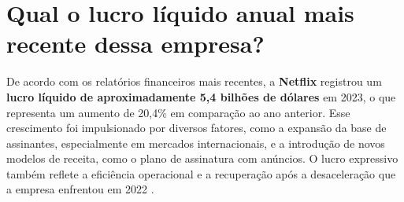 \section{Qual o lucro líquido anual mais recente dessa empresa?}

De acordo com os relatórios financeiros mais recentes, a \textbf{Netflix} registrou um \textbf{lucro líquido de aproximadamente 5,4 bilhões de dólares} em 2023, o que representa um aumento de 20,4\% em comparação ao ano anterior. Esse crescimento foi impulsionado por diversos fatores, como a expansão da base de assinantes, especialmente em mercados internacionais, e a introdução de novos modelos de receita, como o plano de assinatura com anúncios. O lucro expressivo também reflete a eficiência operacional e a recuperação após a desaceleração que a empresa enfrentou em 2022 \cite{netflix_investing2024}.
